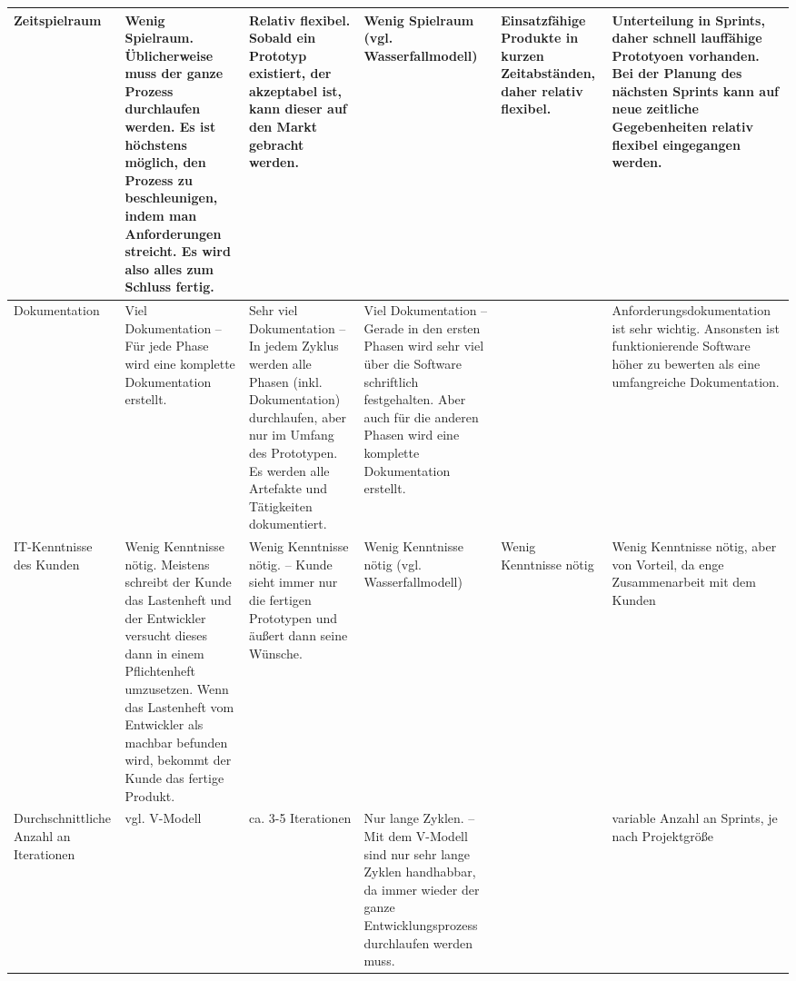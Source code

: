 \documentclass{bschlangaul-aufgabe}
\begin{document}
\begin{bAntwort}
{\begin{tabularx}{\linewidth}{>{\raggedright\arraybackslash}X||>{\raggedright\arraybackslash}X>{\raggedright\arraybackslash}X>{\raggedright\arraybackslash}X>{\raggedright\arraybackslash}X>{\raggedright\arraybackslash}X}
Zeitspielraum &
Wenig Spielraum. Üblicherweise muss der ganze Prozess durchlaufen
werden. Es ist höchstens möglich, den Prozess zu beschleunigen,
indem man Anforderungen streicht. Es wird also alles zum Schluss
fertig. & %
Relativ flexibel. Sobald ein Prototyp existiert, der akzeptabel ist,
kann dieser auf den Markt gebracht werden. & %
Wenig Spielraum (vgl. Wasserfallmodell) & %
Einsatzfähige Produkte in kurzen Zeitabständen, daher relativ
flexibel. & %
Unterteilung in Sprints, daher schnell lauffähige Prototyoen vorhanden.
Bei der Planung des nächsten Sprints kann auf neue zeitliche
Gegebenheiten relativ flexibel eingegangen werden. %
\\\hline

Dokumentation &
Viel Dokumentation – Für jede Phase wird eine komplette Dokumentation
erstellt. & %
Sehr viel Dokumentation – In jedem Zyklus werden alle Phasen
(inkl. Dokumentation) durchlaufen, aber nur im Umfang des
Prototypen. Es werden alle Artefakte und Tätigkeiten dokumentiert.
& %
Viel Dokumentation – Gerade in den ersten Phasen wird sehr viel über
die Software schriftlich festgehalten. Aber auch für die anderen
Phasen wird eine komplette Dokumentation erstellt.
& %
&
Anforderungsdokumentation ist sehr wichtig. Ansonsten ist
funktionierende Software höher zu bewerten als eine umfangreiche
Dokumentation. %
\\\hline

IT-Kenntnisse des Kunden &
Wenig Kenntnisse nötig. Meistens schreibt der Kunde das Lastenheft und
der Entwickler versucht dieses dann in einem Pflichtenheft
umzusetzen. Wenn das Lastenheft vom Entwickler als machbar
befunden wird, bekommt der Kunde das fertige Produkt.
& %
Wenig Kenntnisse nötig. – Kunde sieht immer nur die fertigen Prototypen
und äußert dann seine Wünsche. & %
Wenig Kenntnisse nötig (vgl. Wasserfallmodell) & %
Wenig Kenntnisse nötig & %
Wenig Kenntnisse nötig, aber von Vorteil, da enge Zusammenarbeit mit
dem Kunden %
\\\hline

Durchschnittliche Anzahl an Iterationen &
vgl. V-Modell & %
ca. 3-5 Iterationen & %
Nur lange Zyklen. – Mit dem V-Modell sind nur sehr lange Zyklen
handhabbar, da immer wieder der ganze Entwicklungsprozess durchlaufen
werden muss. & %
& %
variable Anzahl an Sprints, je nach Projektgröße %
\\\hline
\end{tabularx}
}
\end{bAntwort}
\end{document}
